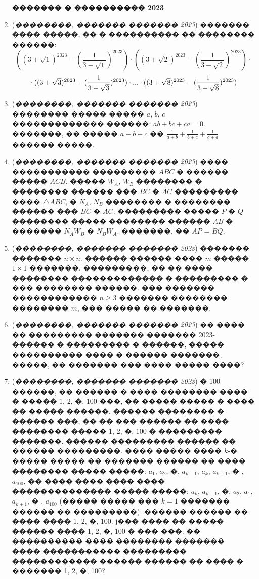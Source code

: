 \documentclass[a4paper,12pt]{article}
\begin{document}
\begin{enumerate}
\textbf{������� � ���������� 2023}

\item (\textit{��������, ������� ������� 2023})  ������� ���� �����, �� � ���������� �� �������� ������: $$((3+\sqrt{1})^{2023}-(\frac{1}{3-\sqrt{1}})^{2023})\cdot ((3+\sqrt{2})^{2023}-(\frac{1}{3-\sqrt{2}})^{2023})\cdot$$
    $$\\ \cdot((3+\sqrt{3})^{2023}-(\frac{1}{3-\sqrt{3}})^{2023})\cdot...\cdot ((3+\sqrt{8})^{2023}-(\frac{1}{3-\sqrt{8}})^{2023})$$

\item (\textit{��������, ������� ������� 2023})  �������� ����� ����� $a$, $b$, $c$ ������������� ������: $ab+bc+ca = 0$. �������, ��
����� $a+b+c$ �� $ \frac{1}{a+b}+\frac{1}{b+c}+\frac{1}{c+a}$ ������ �����.

\item (\textit{��������, ������� ������� 2023}) ���� ����������� ��������� $ABC$ � ������ ����� $ACB$. ����� $W_{A}$, $W_{B}$ �������� � �������� ������ ��� $BC$ � $AC$ ��������� ���� $\bigtriangleup ABC $, � $N_{A}$, $N_{B}$ �������� � �������� ������ ��� $BC$ � $AC$. ��������� ����� $P$ � $Q$ �������� ����� �������� ������ $AB$ � ������� $N_{A}W_{B}$ � $N_{B}W_{A}$. �������, �� $AP$ = $BQ$.

\item (\textit{��������, ������� ������� 2023}) ������� ������� $n\times n$. ������ ������ ���� $m$ ����� $1 \times 1$ �������. ���������, �� �� ���� �������� ������������� � ��������� � ��� �������� ������. ��� ������� ������������ $n\geq 3$ ������� �������� �������� $m$, ��� ����� �� �������.

\item (\textit{��������, ������� ������� 2023}) �� ���� �� ��������� ������� ������� 2023-������ � ��������� � ������, ����� ���������� ���� � ������ �������, �����, �� ������� ��� ���� ����� ����?


\item (\textit{��������, ������� ������� 2023}) � 100 ������, �� ������ � ���� �������� ���� � ����� 1, 2, �, 100 ���, �� �����
����� � ���� �� ����� ������. ������ �������� � ������ ���, �� �� ��� ������ �� ����
�������� ����� 1, 2, �, 100 � ��������� �������. ������ ��������� ������ �� ������
���������. ���� ����� ���� $k$-� ����� ����� �� ������� ������ �� ���� �������� �����
�����: $a_{1}$, $a_{2}$, �, $a_{k-1}$, $a_{k}$, $a_{k+1}$, � , $a_{100}$, �� ���� ���� ���� ���� �������������� �����
�����: $a_{k}$, $a_{k-1}$, �, $a_{2}$, $a_{1}$, $a_{k+1}$, � , $a_{100}$ (����� ����� ��� $k=1$ ������� ������ ��
���������). ������ ������ �� ���� ���� 1, 2, �, 100. ϳ��� ���� �� ����� ������ ����
1, 2, �, 100 � ��� ���. �� ���������� ���� �������� ������� ���� �����������
��������� ������������ ������ ������ �� ���� � ������� 1, 2, �, 100?



\end{enumerate}
\end{document}
